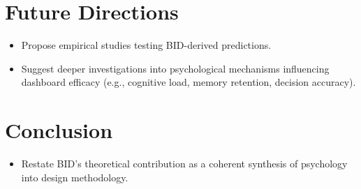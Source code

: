\documentclass[
  authoryear,
  preprint]{elsarticle}
\providecommand{\tightlist}{%
  \setlength{\itemsep}{0pt}\setlength{\parskip}{0pt}}\usepackage{longtable,booktabs,array}
\begin{document}
\section{Future Directions}\label{future-directions}

\begin{itemize}
\tightlist
\item
  Propose empirical studies testing BID-derived predictions.
\item
  Suggest deeper investigations into psychological mechanisms
  influencing dashboard efficacy (e.g., cognitive load, memory
  retention, decision accuracy).
\end{itemize}

\section{Conclusion}\label{conclusion}

\begin{itemize}
\tightlist
\item
  Restate BID's theoretical contribution as a coherent synthesis of
  psychology into design methodology.
\end{itemize}


  
\end{document}
